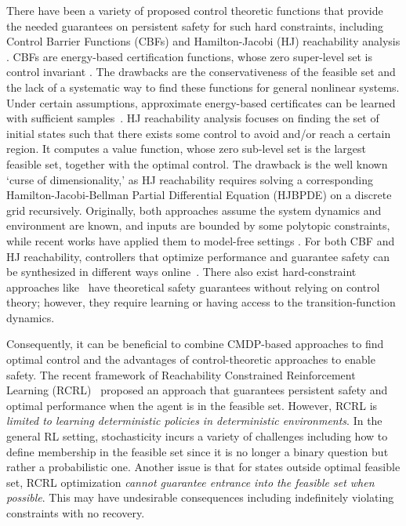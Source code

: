 \documentclass{article}
\theoremstyle{definition}
\begin{document}
 
There have been a variety of proposed control theoretic functions that provide the needed guarantees on persistent safety for such hard constraints, including Control Barrier Functions (CBFs) \cite{cbfsurvey} and Hamilton-Jacobi (HJ) reachability analysis \cite{fisac2015reach, hjreachabilityoverview}. CBFs are energy-based certification functions, whose zero super-level set is control invariant \cite{ames2014rapidly,ames_robust}. The drawbacks are the conservativeness of the feasible set and the lack of a systematic way to find these functions for general nonlinear systems. Under certain assumptions, approximate energy-based certificates can be learned with sufficient samples~\cite{NLC, Chang2021, qin2022quantifying, Ganai2023, yang2023model, wang2023enforcing}. HJ reachability analysis focuses on finding the set of initial states such that there exists some control to avoid and/or reach a certain region. It computes a value function, whose zero sub-level set is the largest feasible set, together with the optimal control. The drawback is the well known `curse of dimensionality,' as HJ reachability requires solving a corresponding Hamilton-Jacobi-Bellman Partial Differential Equation (HJBPDE) on a discrete grid recursively. Originally, both approaches assume the system dynamics and environment are known, and inputs are bounded by some polytopic constraints, while recent works have applied them to model-free settings \cite{molnar2021model, akametalu2018minimum, fisac2019bridging}. For both CBF and HJ reachability, controllers that optimize performance and guarantee safety can be synthesized in different ways online~\cite{cbfqptac}. There also exist hard-constraint approaches like~\cite{xiong2023provably} have theoretical safety guarantees without relying on control theory; however, they require learning or having access to the transition-function dynamics.




Consequently, it can be beneficial to combine CMDP-based approaches to find optimal control and the advantages of control-theoretic approaches to enable safety. The recent framework of Reachability Constrained Reinforcement Learning (RCRL)~\cite{yu2022reachability} proposed an approach that guarantees persistent safety and optimal performance when the agent is in the feasible set. However, RCRL is \emph{limited to learning deterministic policies in deterministic environments}. 
In the general RL setting, stochasticity incurs a variety of challenges including how to define membership in the feasible set since it is no longer a binary question but rather a probabilistic one. 
Another issue is that for states outside optimal feasible set, RCRL optimization \emph{cannot guarantee entrance into the feasible set when possible}. This may have undesirable consequences including indefinitely violating constraints with no recovery.  
\end{document}
